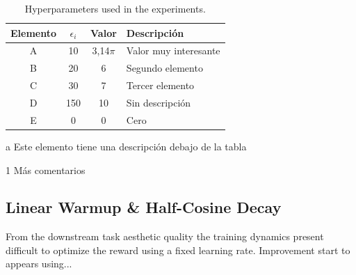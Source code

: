 \begin{appendixs}
	\enabletablerowcolor[2] %
	\begin{table}[H]
		\begin{threeparttable}
		\centering
		\caption{Hyperparameters used in the experiments.}
		\begin{tabular}{cccC{4cm}}
			\hline
			\textbf{Elemento} & $\epsilon_i$ & \textbf{Valor} & \textbf{Descripción} \bigstrut \\
			\hline
			A     & 10    & 3,14$\pi$ & Valor muy interesante \\
			B     & 20    & 6 & Segundo elemento \\
			C     & 30    & 7 & Tercer elemento \\
			D     & 150    & 10 & Sin descripción \\
			E     & 0    & 0 & Cero \\
			\hline
			\end{tabular}
		\begin{tablenotes}
			\item[a] Este elemento tiene una descripción debajo de la tabla
			\item[1] Más comentarios
		\end{tablenotes}
		\end{threeparttable}
		\label{tab:anexo-1}
	\end{table}
	\disabletablerowcolor %

    \subsection{Linear Warmup \& Half-Cosine Decay}

    From the downstream task aesthetic quality the training dynamics present difficult to optimize the reward using a fixed learning rate. Improvement start to appears using...%



\end{appendixs}